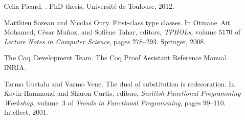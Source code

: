 \documentclass[a4paper,UKenglish]{lipics}
\begin{document}
\begin{thebibliography}{10}
Celia Picard.
.
\newblock PhD thesis, Université de Toulouse, 2012.

Matthieu Sozeau and Nicolas Oury.
\newblock First-class type classes.
\newblock In Otmane~A\"{\i}t Mohamed, C{\'e}sar Mu{\~n}oz, and Sofi{\`e}ne
  Tahar, editors, {\em TPHOLs}, volume 5170 of {\em Lecture Notes in Computer
  Science}, pages 278--293. Springer, 2008.

{T}he {C}oq~{D}evelopment {T}eam.
\newblock The {C}oq {P}roof {A}ssistant {R}eference {M}anual.
\newblock INRIA.

Tarmo Uustalu and Varmo Vene.
\newblock The dual of substitution is redecoration.
\newblock In Kevin Hammond and Sharon Curtis, editors, {\em Scottish Functional
  Programming Workshop}, volume~3 of {\em Trends in Functional Programming},
  pages 99--110. Intellect, 2001.

\end{thebibliography}
\end{document}
